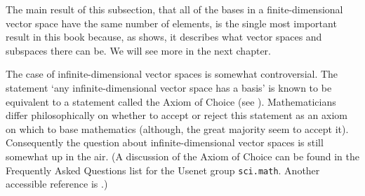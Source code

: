 The main result of this subsection, that all of 
the bases in a finite-dimensional
vector space have the same number of elements, is the single most important
result in this book because, as 
shows, it describes what vector spaces and subspaces there can be.
We will see more in the next chapter.

\begin{remark}
The case of infinite-dimensional vector spaces is somewhat controversial.
The statement `any infinite-dimensional vector space has a basis'
is known to be equivalent to a statement called the Axiom of Choice
(see \cite{Blass84}).
Mathematicians differ philosophically on whether to accept or reject 
this statement as an axiom on which to base mathematics
(although, the great majority seem to accept it).
Consequently the question about infinite-dimensional vector spaces is
still somewhat up in the air.
(A discussion of the Axiom of Choice can be found in the
Frequently Asked Questions list for the Usenet group \texttt{sci.math}.
Another accessible reference is \cite{Rucker}.)
\end{remark}

